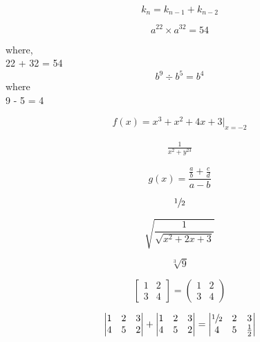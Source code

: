 \documentclass{article}
\begin{document}
\begin{equation}
    k_n=k_{n-1}+k_{n-2}
\end{equation}

\begin{center}
    \begin{equation}
        a^{22} \times a^{32}=54
    \end{equation}

    where,\\
    22 + 32 = 54
    \begin{equation}
        b^9 \div b^5=b^4
    \end{equation}
    where \\
    9 - 5 = 4
\end{center}

\begin{equation}
    f(x)=x^3+x^2+4x+3|_{x=-2}
\end{equation}

\begin{align*}
    \frac{1}{x^2+y^{23}} 
\end{align*}


\begin{equation}
    g(x)=\frac{\frac{a}{b}+\frac{c}{d}}{a-b}
\end{equation}

\begin{equation}
    \sfrac{1}{2} %
\end{equation}

\begin{equation}
    \sqrt{\frac{1}{\sqrt{x^2+2x+3}}}
\end{equation}


\begin{equation}
    \sqrt[3]{9}
\end{equation}

\[
\begin{bmatrix}
    1&2\\
    3&4
\end{bmatrix}
=
\begin{pmatrix}
    1&2\\
    3&4
\end{pmatrix}
\]

\[
\begin{vmatrix}
    1&2&3 \\
    4&5&2
\end{vmatrix}
+
\begin{vmatrix}
    1&2&3 \\
    4&5&2
\end{vmatrix}
=
\begin{vmatrix}
    \sfrac{1}{2}&2&3 \\
    4&5&\frac{1}{2}
\end{vmatrix}
\]
\end{document}
